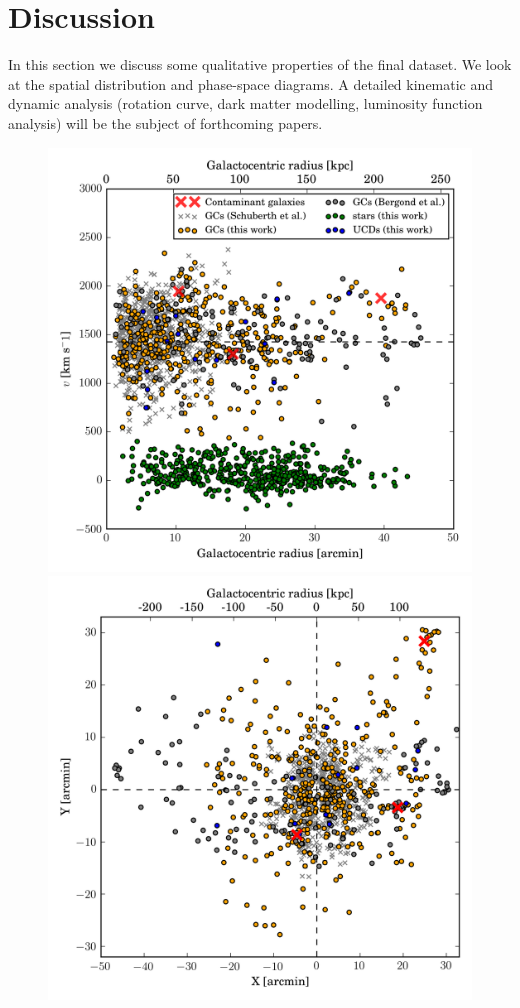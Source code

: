 \documentclass[useAMS,usenatbib]{mn2e}
\begin{document}
\section{Discussion}
\label{sec:discussion}
In this section we discuss some qualitative properties of the final dataset. We 
look at the spatial distribution and phase-space diagrams. A detailed kinematic 
and dynamic analysis (rotation curve, dark matter modelling, luminosity 
function analysis) will be the subject of forthcoming papers.

\begin{figure}
\centering
\includegraphics[width=\columnwidth]{figures/RV.png} 
\includegraphics[width=\columnwidth]{figures/XY.png} 

\end{figure}
\end{document}
